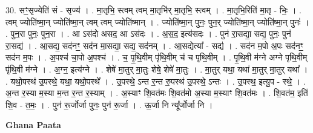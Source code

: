 \documentclass[17pt]{extarticle}
\begin{document}
30. सꣳ॒॒सृज्येति॑ सं - सृज्य॑ । . मा॒तृभि॒ स्त्वम् त्वम् मा॒तृभि॑र् मा॒तृभि॒ स्त्वम् । . मा॒तृभि॒रिति॑ मा॒तृ - भिः॒ । . त्वम् ज्योति॑ष्मा॒न् ज्योति॑ष्मा॒न् त्वम् त्वम् ज्योति॑ष्मान् । . ज्योति॑ष्मा॒न् पुनः॒ पुन॒र् ज्योति॑ष्मा॒न् ज्योति॑ष्मा॒न् पुनः॑ । . पुन॒रा पुनः॒ पुन॒रा । . आ ऽस॑दो असद॒ आ ऽस॑दः । . अ॒स॒द॒ इत्य॑सदः । . पुन॑ रा॒सद्या॒ सद्य॒ पुनः॒ पुन॑ रा॒सद्य॑ । . आ॒सद्य॒ सद॑नꣳ॒॒ सद॑न मा॒सद्या॒ सद्य॒ सद॑नम् । . आ॒सद्येत्या᳚ - सद्य॑ । . सद॑न म॒पो अ॒पः सद॑नꣳ॒॒ सद॑न म॒पः । . अ॒पश्च॑ चा॒पो अ॒पश्च॑ । . च॒ पृ॒थि॒वीम् पृ॑थि॒वीम् च॑ च पृथि॒वीम् । . पृ॒थि॒वी म॑ग्ने अग्ने पृथि॒वीम् पृ॑थि॒वी म॑ग्ने । . अ॒ग्न॒ इत्य॑ग्ने । . शेषे॑ मा॒तुर् मा॒तुः शेषे॒ शेषे॑ मा॒तुः । . मा॒तुर् यथा॒ यथा॑ मा॒तुर् मा॒तुर् यथा᳚ । . यथो॒पस्थ॑ उ॒पस्थे॒ यथा॒ यथो॒पस्थे᳚ । . उ॒पस्थे॒ ऽन्त र॒न्त रु॒पस्थ॑ उ॒पस्थे॒ ऽन्तः । . उ॒पस्थ॒ इत्यु॒प - स्थे॒ । . अ॒न्त र॒स्या म॒स्या म॒न्त र॒न्त र॒स्याम् । . अ॒स्याꣳ शि॒वत॑मः शि॒वत॑मो अ॒स्या म॒स्याꣳ शि॒वत॑मः । . शि॒वत॑म॒ इति॑ शि॒व - त॒मः॒ । . पुन॑ रू॒र्जोर्जा पुनः॒ पुन॑ रू॒र्जा । . ऊ॒र्जा नि न्यू᳚र्जोर्जा नि । \newline

\textbf{Ghana Paata } \newline
\end{document}
